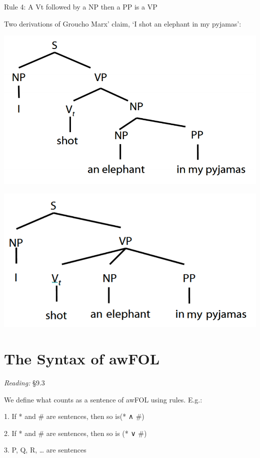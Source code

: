 \documentclass[12pt]{extarticle}
\begin{document}
\begin{multicols*}{3}
Rule 4: A Vt followed by a NP then a PP is a VP
 
Two derivations of Groucho Marx’ claim, ‘I shot an elephant in my pyjamas':
 
\begin{center}
\includegraphics[scale=0.3]{img/groucho1.png}
\end{center}
\begin{center}
\includegraphics[scale=0.3]{img/groucho2.png}
\end{center}
 
 
\section{The Syntax of awFOL}
 
\emph{Reading:} §9.3
 
We define what counts as a sentence of awFOL using rules. E.g.:
 
1. If * and \# are sentences, then so is(* ∧ \#)
 
2. If * and \# are sentences, then so is (* ∨ \#)
 
3. P, Q, R, … are sentences
 

\end{multicols*}
\end{document}
